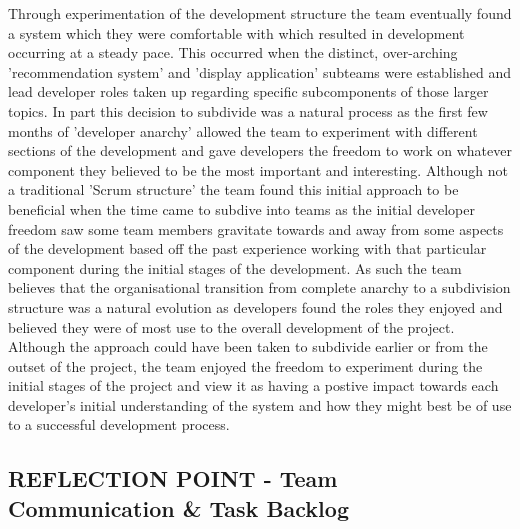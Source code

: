 \documentclass{l3proj}
\begin{document}
Through experimentation of the development structure the team eventually found a system which they were comfortable with which resulted in development occurring at a steady pace. This occurred when the distinct, over-arching 'recommendation system' and 'display application' subteams were established and lead developer roles taken up regarding specific subcomponents of those larger topics. In part this decision to subdivide was a natural process as the first few months of 'developer anarchy' allowed the team to experiment with different sections of the development and gave developers the freedom to work on whatever component they believed to be the most important and interesting. Although not a traditional 'Scrum structure' the team found this initial approach to be beneficial when the time came to subdive into teams as the initial developer freedom saw some team members gravitate towards and away from some aspects of the development based off the past experience working with that particular component during the initial stages of the development. As such the team believes that the organisational transition from complete anarchy to a subdivision structure was a natural evolution as developers found the roles they enjoyed and believed they were of most use to the overall development of the project. Although the approach could have been taken to subdivide earlier or from the outset of the project, the team enjoyed the freedom to experiment during the initial stages of the project and view it as having a postive impact towards each developer's initial understanding of the system and how they might best be of use to a successful development process.
    

\subsection{REFLECTION POINT - Team Communication \& Task Backlog}
\label{sec:communication}

\end{document}
